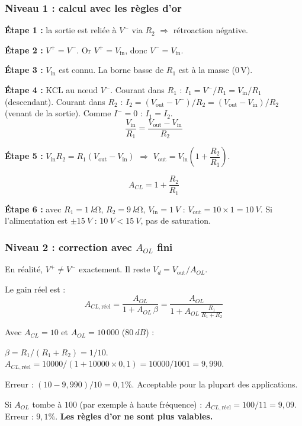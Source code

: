 \documentclass[12pt,a4paper,twoside]{book}
\begin{document}
\subsubsection*{Niveau 1 : calcul avec les règles d'or}

\begin{pratique}
\textbf{Étape 1 :} la sortie est reliée à $V^-$ via $R_2$ $\Rightarrow$ rétroaction négative. \checkmark

\textbf{Étape 2 :} $V^+ = V^-$. Or $V^+ = V_{\text{in}}$, donc $V^- = V_{\text{in}}$.

\textbf{Étape 3 :} $V_{\text{in}}$ est connu. La borne basse de $R_1$ est à la masse ($0$\,V).

\textbf{Étape 4 :} KCL au n\oe ud $V^-$. Courant dans $R_1$ : $I_1 = V^-/R_1 = V_{\text{in}}/R_1$ (descendant). Courant dans $R_2$ : $I_2 = (V_{\text{out}} - V^-)/R_2 = (V_{\text{out}} - V_{\text{in}})/R_2$ (venant de la sortie). Comme $I^- = 0$ : $I_1 = I_2$.
\[
\frac{V_{\text{in}}}{R_1} = \frac{V_{\text{out}} - V_{\text{in}}}{R_2}
\]

\textbf{Étape 5 :} $V_{\text{in}} R_2 = R_1 (V_{\text{out}} - V_{\text{in}})$ $\Rightarrow$ $V_{\text{out}} = V_{\text{in}}\left(1 + \dfrac{R_2}{R_1}\right)$.

\[
\boxed{A_{CL} = 1 + \frac{R_2}{R_1}}
\]

\textbf{Étape 6 :} avec $R_1 = \SI{1}{k\ohm}$, $R_2 = \SI{9}{k\ohm}$, $V_{\text{in}} = \SI{1}{V}$ : $V_{\text{out}} = 10\times1 = \SI{10}{V}$. Si l'alimentation est $\pm\SI{15}{V}$ : $\SI{10}{V} < \SI{15}{V}$, pas de saturation. \checkmark
\end{pratique}

\subsubsection*{Niveau 2 : correction avec $A_{OL}$ fini}

\begin{pratique}
En réalité, $V^+ \neq V^-$ exactement. Il reste $V_d = V_{\text{out}}/A_{OL}$.

Le gain réel est :
\[
A_{CL,\text{réel}} = \frac{A_{OL}}{1 + A_{OL}\,\beta} = \frac{A_{OL}}{1 + A_{OL}\,\frac{R_1}{R_1+R_2}}
\]

Avec $A_{CL} = 10$ et $A_{OL} = 10\,000$ ($\SI{80}{dB}$) :

$\beta = R_1/(R_1+R_2) = 1/10$. $A_{CL,\text{réel}} = 10000/(1+10000\times0{,}1) = 10000/1001 = 9{,}990$.

Erreur : $(10 - 9{,}990)/10 = 0{,}1\%$. Acceptable pour la plupart des applications.

Si $A_{OL}$ tombe à $100$ (par exemple à haute fréquence) : $A_{CL,\text{réel}} = 100/11 = 9{,}09$. Erreur : $9{,}1\%$. \textbf{Les règles d'or ne sont plus valables.}
\end{pratique}
\end{document}
